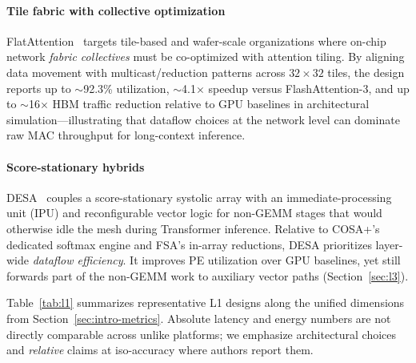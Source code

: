 \documentclass[conference]{IEEEtran}
\begin{document}
\paragraph{Tile fabric with collective optimization}
FlatAttention~\cite{flatattention2026} targets tile-based and wafer-scale organizations where on-chip network \emph{fabric collectives} must be co-optimized with attention tiling.
By aligning data movement with multicast/reduction patterns across $32 \times 32$ tiles, the design reports up to $\sim$92.3\% utilization, $\sim$4.1$\times$ speedup versus FlashAttention-3, and up to $\sim$16$\times$ HBM traffic reduction relative to GPU baselines in architectural simulation---illustrating that dataflow choices at the network level can dominate raw MAC throughput for long-context inference.

\paragraph{Score-stationary hybrids}
DESA~\cite{desa2025} couples a score-stationary systolic array with an immediate-processing unit (IPU) and reconfigurable vector logic for non-GEMM stages that would otherwise idle the mesh during Transformer inference.
Relative to COSA+'s dedicated softmax engine and FSA's in-array reductions, DESA prioritizes layer-wide \emph{dataflow efficiency}.
It improves PE utilization over GPU baselines, yet still forwards part of the non-GEMM work to auxiliary vector paths (Section~\ref{sec:l3}).

Table~\ref{tab:l1} summarizes representative L1 designs along the unified dimensions from Section~\ref{sec:intro-metrics}.
Absolute latency and energy numbers are not directly comparable across unlike platforms; we emphasize architectural choices and \emph{relative} claims at iso-accuracy where authors report them.

\begin{table}[t]
\caption{Representative FlashAttention-native accelerator designs (L1).
Util.\ = PE or layer utilization; eval.\ = dominant evaluation level.}
\label{tab:l1}
\centering
\scriptsize
\setlength{\tabcolsep}{2pt}
\renewcommand{\arraystretch}{1.05}
\end{table}
\end{document}
